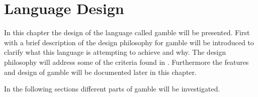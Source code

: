 \chapter{Language Design}
\label{cha:language_design}
In this chapter the design of the language called \gls{gamble} will be presented.
First with a brief description of the design philosophy for \gls{gamble} will be introduced to clarify what this language is attempting to achieve and why.
The design philosophy will address some of the criteria found in .
Furthermore the features and design of \gls{gamble} will be documented later in this chapter.



In the following sections different parts of \gls{gamble} will be investigated.











